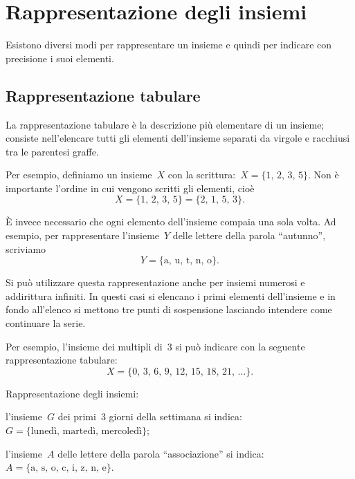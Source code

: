 \chapter{Rappresentazione degli insiemi}

Esistono diversi modi per rappresentare un insieme e quindi per indicare
con precisione i suoi elementi.

\section{Rappresentazione tabulare}

La rappresentazione tabulare è la descrizione più elementare di un
insieme; consiste nell'elencare tutti gli elementi dell'insieme separati da virgole e racchiusi tra le
parentesi graffe.

Per esempio, definiamo un insieme~$X$ con la scrittura:~$X=\{\text{1, 2, 3, 5}\}$.
Non è importante l'ordine in cui vengono scritti gli elementi, cioè
\[X=\{\text{1, 2, 3, 5}\}=\{\text{2, 1, 5, 3}\}.\]

È invece necessario che ogni elemento dell'insieme compaia una sola volta. Ad esempio, per rappresentare
l'insieme~$Y$ delle lettere della parola ``autunno'', scriviamo
\[Y = \{\text{a, u, t, n, o}\}.\]

Si può utilizzare questa rappresentazione anche per insiemi numerosi e addirittura infiniti. In questi casi si elencano i primi elementi
dell'insieme e in fondo all'elenco si mettono tre punti di sospensione lasciando intendere come continuare la serie.

Per esempio, l'insieme dei multipli di~3 si può indicare con la seguente rappresentazione tabulare:
\[X=\{\text{0, 3, 6, 9, 12, 15, 18, 21, }\ldots\}.\]


\begin{exrig}
 \begin{esempio}
Rappresentazione degli insiemi:
 \begin{enumeratea}
\item l'insieme~$G$ dei primi~3 giorni della settimana si indica:~$G=\{\text{lunedì, martedì, mercoledì}\}$;
\item l'insieme~$A$ delle lettere della parola ``associazione'' si indica:~$A=\{\text{a, s, o, c, i, z, n, e}\}$.
\end{enumeratea}
 \end{esempio}
\end{exrig}

\ovalbox{\risolvii \ref{ese:6.1}, \ref{ese:6.2}, \ref{ese:6.3}, \ref{ese:6.4}, \ref{ese:6.5}}

